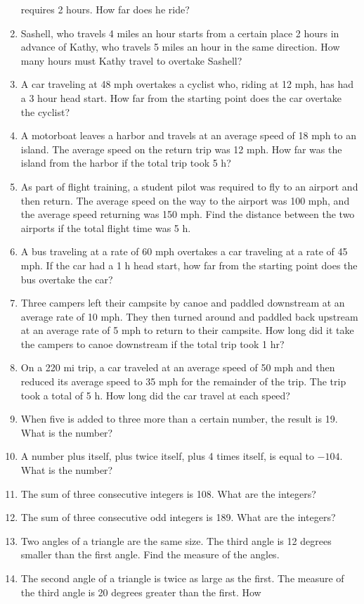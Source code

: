 \documentclass[12pt]{article}
\theoremstyle{definition}
\begin{document}
\begin{enumerate}
requires 2 hours. How far does he ride?
\item Sashell, who travels 4 miles an hour starts from a certain place 2 hours in advance of Kathy, who travels 5 miles an hour in the same direction.
How many hours must Kathy travel to overtake Sashell?
\item A car traveling at 48 mph overtakes a cyclist who, riding at 12 mph, has had a 3 hour head start. How far from the starting point does
the car overtake the cyclist?
\item A motorboat leaves a harbor and travels at an average speed of 18 mph to an island. The average speed on the return trip was 12 mph. How
far was the island from the harbor if the total trip took 5 h?
\item As part of flight training, a student pilot was required to fly to an airport and then return. The average speed on the way to the
airport was 100 mph, and the average speed returning was 150 mph. Find the distance between the two airports if the total
flight time was 5 h.
\item A bus traveling at a rate of 60 mph overtakes a car traveling at a rate of 45 mph. If the car had a 1 h head start, how far from the
starting point does the bus overtake the car?
\item Three campers left their campsite by canoe and paddled downstream at an average rate of 10 mph. They then turned around and paddled
back upstream at an average rate of 5 mph to return to their campsite. How long did it take the campers to canoe downstream if the total trip took 1 hr?
\item On a 220 mi trip, a car traveled at an average speed of 50 mph and then reduced its average speed to 35 mph for the remainder
of the trip. The trip took a total of 5 h. How long did the car travel at each speed?
\item When five is added to three more than a certain number, the result is 19.  What is the number?
\item A number plus itself, plus twice itself, plus 4 times itself, is equal to $- 104$. What is the number?
\item The sum of three consecutive integers is 108. What are the integers?
\item The sum of three consecutive odd integers is 189. What are the integers?
\item Two angles of a triangle are the same size. The third angle is 12 degrees smaller than the first angle. Find the measure of the
angles.
\item The second angle of a triangle is twice as large as the first. The measure of the third angle is 20 degrees greater than the first. How

\end{enumerate}
\end{document}
